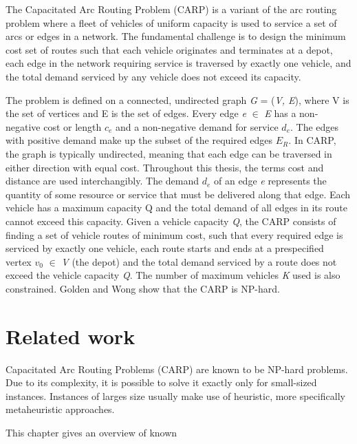 \documentclass[twoside]{ctuthesis}
\theoremstyle{plain}
\theoremstyle{definition}
\theoremstyle{note}
\begin{document}
The Capacitated Arc Routing Problem (CARP) is a variant of the arc routing problem where a fleet of vehicles of uniform capacity is used to service a set of arcs or edges in a network. The fundamental challenge is to design the minimum cost set of routes such that each vehicle originates and terminates at a depot, each edge in the network requiring service is traversed by exactly one vehicle, and the total demand serviced by any vehicle does not exceed its capacity.

The problem is defined on a connected, undirected graph \emph{G} = (\emph{V, E}), where V is the set of vertices and E is the set of edges. Every edge \emph{e} $\in$ \emph{E} has a non-negative cost or length \emph{$ c_e $} and a non-negative demand for service \emph{$ d_e $}. The edges with positive demand make up the subset of the required edges \emph{$ E_R $}. In CARP, the graph is typically undirected, meaning that each edge can be traversed in either direction with equal cost. Throughout this thesis, the terms cost and distance are used interchangibly.
The demand \emph{$ d_e $} of an edge \emph{e} represents the quantity of some resource or service that must be delivered along that edge. Each vehicle has a maximum capacity Q and the total demand of all edges in its route cannot exceed this capacity.
Given a vehicle capacity \emph{Q}, the CARP consists
of finding a set of vehicle routes of minimum cost,
such that every required edge is serviced by exactly
one vehicle, each route starts and ends at a prespecified vertex \emph{$ v_0 $} $\in$ \emph{V} (the depot) and the total
demand serviced by a route does not exceed the
vehicle capacity \emph{Q}. The number of maximum vehicles \emph{K} used is also constrained.  Golden and Wong \cite{golden1981capacitated} show that the CARP is NP-hard. 


\chapter{Related work}
Capacitated Arc Routing Problems (CARP) are known to be NP-hard problems. Due to its complexity, it is possible to solve it exactly only for small-sized instances. Instances of larges size usually make use of heuristic, more specifically metaheuristic approaches.

This chapter gives an overview of known 
\end{document}
